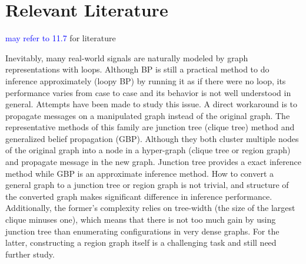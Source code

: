 \section{Relevant Literature}
\textcolor{blue}{may refer to 11.7} for literature

Inevitably, many real-world signals are naturally modeled by graph representations with loops. Although BP is still a practical method to do inference approximately (loopy BP) by running it as if there were no loop, its performance varies from case to case and its behavior is not well understood in general. Attempts have been made to study this issue. A direct workaround is to propagate messages on a manipulated graph instead of the original graph. The representative methods of this family are junction tree (clique tree) method \cite[section~10]{koller2009pgm} and generalized belief propagation (GBP)\cite{yedida2005constucting}. Although they both cluster multiple nodes of the original graph into a node in a hyper-graph (clique tree or region graph) and propagate message in the new graph. Junction tree provides a exact inference method while GBP is an approximate inference method. How to convert a general graph to a junction tree or region graph is not trivial, and structure of the converted graph makes significant difference in inference performance. Additionally, the former's complexity relies on tree-width (the size of the largest clique minuses one), which means that there is not too much gain by using junction tree than enumerating configurations in very dense graphs. For the latter, constructing a region graph itself is a challenging task and still need further study.

